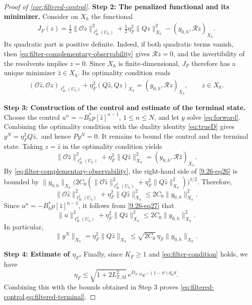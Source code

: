 \documentclass[print,wide,eng]{draft}
\begin{document}
\begin{proof}[Proof of \cref{cor:filtered-control}]
\textbf{Step 2: The penalized functional and its minimizer.}
Consider on $X_h$ the functional
\begin{align}\label{eq:filter-functional}
	J_F(z)=\tfrac12\|\mathscr Oz\|_{\ell_{\delta t}^2(U_h)}^2
	+\tfrac12\eta_F^2\|Qz\|_{X_h}^2-(y_{0,h},\mathscr Rz)_{X_h}.
\end{align}
Its quadratic part is positive definite. Indeed, if both quadratic terms vanish, then \cref{eq:filter-complementary-observability} gives $\mathscr Rz=0$, and the invertibility of the resolvents implies $z=0$. Since $X_h$ is finite-dimensional, $J_F$ therefore has a unique minimizer $\widehat z\in X_h$. Its optimality condition reads
\begin{align*}
	(\mathscr O\widehat z,\mathscr Oz)_{\ell_{\delta t}^2(U_h)}
	+\eta_F^2(Q\widehat z,Qz)_{X_h}
	=(y_{0,h},\mathscr Rz)_{X_h},
	\qquad z\in X_h.
\end{align*}

\medskip

\textbf{Step 3: Construction of the control and estimate of the terminal state.}
Choose the control
$
u^n=-B_h^*p[\widehat z]^{n-1}$, $1\le n\le N$,
and let $y$ solve \cref{eq:forward}. Combining the optimality condition with the duality identity \cref{eq:trueD} gives
$
y^N=\eta_F^2Q\widehat z,
$
and hence $Py^N=0$. It remains to bound the control and the terminal state. Taking $z=\widehat z$ in the optimality condition yields
%
\begin{equation}\label{9.26-eq26}
\|\mathscr O\widehat z\|_{\ell_{\delta t}^2(U_h)}^2
+\eta_F^2\|Q\widehat z\|_{X_h}^2
=(y_{0,h},\mathscr R\widehat z)_{X_h}.
\end{equation}
%
By \cref{eq:filter-complementary-observability}, the right-hand side of \eqref{9.26-eq26} is bounded by
$
\|y_{0,h}\|_{X_h}
\bigl(2C_0(\|\mathscr O\widehat z\|_{\ell_{\delta t}^2(U_h)}^2
+\eta_F^2\|Q\widehat z\|_{X_h}^2)\bigr)^{1/2}.
$
Therefore,
%
\begin{equation}\label{9.26-eq27}
\|\mathscr O\widehat z\|_{\ell_{\delta t}^2(U_h)}^2
+\eta_F^2\|Q\widehat z\|_{X_h}^2
\le2C_0\|y_{0,h}\|_{X_h}^2.
\end{equation}
%
Since $u^n=-B_h^*p[\widehat z]^{n-1}$, it follows from \eqref{9.26-eq27} that
%
$$
\|u\|_{\ell_{\delta t}^2(U_h)}^2+\eta_F^2\|Q\widehat z\|_{X_h}^2
\le2C_0\|y_{0,h}\|_{X_h}^2.
$$
In particular,
$$
\|y^N\|_{X_h}
=\eta_F^2\|Q\widehat z\|_{X_h}
\le\sqrt{2C_0}\,\eta_F\|y_{0,h}\|_{X_h}.
$$

\medskip

\textbf{Step 4: Estimate of $\eta_F$.}
Finally, since $K_F\ge1$ and \cref{eq:filter-condition} holds, we have
$$
\eta_F\le\sqrt{1+2L_{T,M}^2}\,e^{D_{T,M}}e^{-(1-\vartheta)d_0S}.
$$
Combining this with the bounds obtained in Step 3 proves
\cref{eq:filtered-control,eq:filtered-terminal}.
\end{proof}
%




\end{document}
